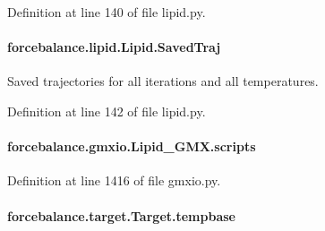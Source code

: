 Definition at line 140 of file lipid.\-py.

\hypertarget{classforcebalance_1_1lipid_1_1Lipid_a49bef67b40e46c5df608c00d2519b111}{
\paragraph[{Saved\-Traj}]{\setlength{\rightskip}{0pt plus 5cm}forcebalance.\-lipid.\-Lipid.\-Saved\-Traj\hspace{0.3cm}{\ttfamily [inherited]}}}\label{classforcebalance_1_1lipid_1_1Lipid_a49bef67b40e46c5df608c00d2519b111}


Saved trajectories for all iterations and all temperatures. 



Definition at line 142 of file lipid.\-py.

\hypertarget{classforcebalance_1_1gmxio_1_1Lipid__GMX_a1fa6e5f0984375c3b0e69d39b917a328}{
\paragraph[{scripts}]{\setlength{\rightskip}{0pt plus 5cm}forcebalance.\-gmxio.\-Lipid\-\_\-\-G\-M\-X.\-scripts}}\label{classforcebalance_1_1gmxio_1_1Lipid__GMX_a1fa6e5f0984375c3b0e69d39b917a328}


Definition at line 1416 of file gmxio.\-py.

\hypertarget{classforcebalance_1_1target_1_1Target_ae5b544d3e11365865813ef3d626ef81d}{
\paragraph[{tempbase}]{\setlength{\rightskip}{0pt plus 5cm}forcebalance.\-target.\-Target.\-tempbase\hspace{0.3cm}{\ttfamily [inherited]}}}\label{classforcebalance_1_1target_1_1Target_ae5b544d3e11365865813ef3d626ef81d}


